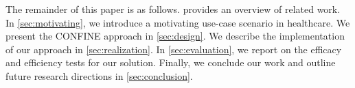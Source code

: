The remainder of this paper is as follows.  provides an overview of related work. %
In \cref{sec:motivating}, we introduce a motivating use-case scenario in healthcare. We present the CONFINE approach in \cref{sec:design}. We describe the implementation of our approach in \cref{sec:realization}. %
In \cref{sec:evaluation}, we report on the efficacy and efficiency tests for our solution.
Finally, we conclude our work and outline future research directions in \cref{sec:conclusion}.
